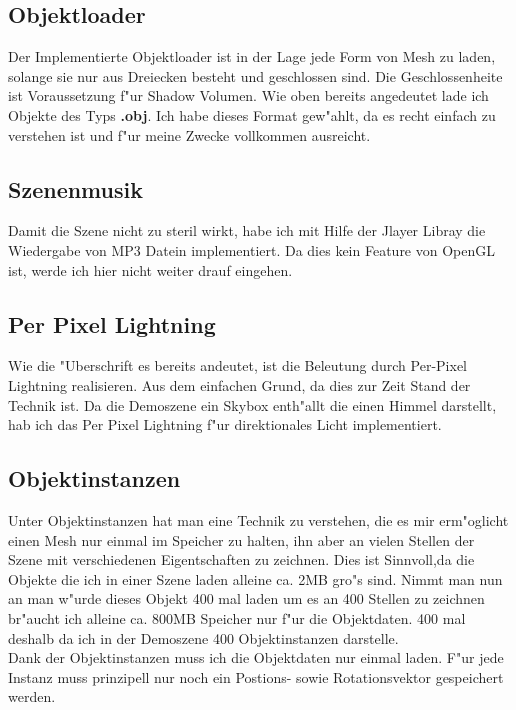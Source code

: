 \documentclass[a4paper,titlepage]{article}
\begin{document}
\subsection{Objektloader}
Der Implementierte Objektloader ist in der Lage jede Form von Mesh zu laden, solange sie nur aus Dreiecken 
besteht und geschlossen sind. Die Geschlossenheite ist Voraussetzung f"ur Shadow Volumen.
Wie oben bereits angedeutet lade ich Objekte des Typs \textbf{.obj}. Ich habe dieses Format gew"ahlt, da es 
recht einfach zu verstehen ist und f"ur meine Zwecke vollkommen ausreicht. 

\subsection{Szenenmusik}
Damit die Szene nicht zu steril wirkt, habe ich mit Hilfe der Jlayer Libray die Wiedergabe von MP3 Datein
implementiert. Da dies kein Feature von OpenGL ist, werde ich hier nicht weiter drauf eingehen. 

\subsection{Per Pixel Lightning}
Wie die "Uberschrift es bereits andeutet, ist die Beleutung durch Per-Pixel Lightning realisieren. 
Aus dem einfachen Grund, da dies zur Zeit Stand der Technik ist. Da die Demoszene ein Skybox
enth"allt die einen Himmel darstellt, hab ich das Per Pixel Lightning f"ur direktionales Licht implementiert.

\subsection{Objektinstanzen}
Unter Objektinstanzen hat man eine Technik zu verstehen, die es mir erm"oglicht einen Mesh nur einmal im 
Speicher zu halten, ihn aber an vielen Stellen der Szene mit verschiedenen Eigentschaften zu zeichnen. Dies 
ist Sinnvoll,da die Objekte die ich in einer Szene laden alleine ca. 2MB gro"s sind. Nimmt man nun an man w"urde 
dieses Objekt 400 mal laden um es an 400 Stellen zu zeichnen br"aucht ich alleine ca. 800MB Speicher nur 
f"ur die Objektdaten. 400 mal deshalb da ich in der Demoszene 400 Objektinstanzen darstelle.\\
Dank der Objektinstanzen muss ich die Objektdaten nur einmal laden. F"ur jede Instanz muss prinzipell nur noch 
ein Postions- sowie Rotationsvektor gespeichert werden.
\end{document}
